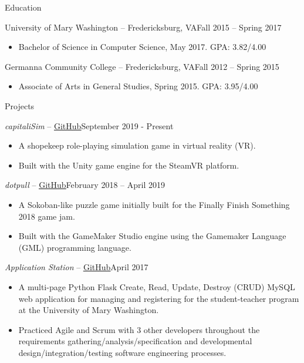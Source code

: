 \documentclass[calibri]{mcdowellcv}
\begin{document}
	\begin{cvsection}{Education}
		\begin{cvsubsection}{University of Mary Washington -- Fredericksburg, VA}{Fall 2015 -- Spring 2017}
			\begin{itemize}
				\item Bachelor of Science in Computer Science, May 2017. GPA: 3.82/4.00
			\end{itemize}
		\end{cvsubsection}
		\begin{cvsubsection}{Germanna Community College -- Fredericksburg, VA}{Fall 2012 -- Spring 2015}
			\begin{itemize}
				\item Associate of Arts in General Studies, Spring 2015. GPA: 3.95/4.00
			\end{itemize}
		\end{cvsubsection}
	\end{cvsection}
	
	\begin{cvsection}{Projects}
		\begin{cvsubsection}{\textit{capitaliSim} -- \href{https://github.com/acarlyle/shopvr}{\underline{GitHub}}}{September 2019 - Present}	
			\begin{itemize}
				\item A shopekeep role-playing simulation game in virtual reality (VR).
				\item Built with the Unity game engine for the SteamVR platform.  
			\end{itemize}
		\end{cvsubsection}
		
		\begin{cvsubsection}{\textit{dotpull} -- \href{https://github.com/acarlyle/dotpull}{\underline{GitHub}}}{February 2018 -- April 2019}	
			\begin{itemize}
				\item A Sokoban-like puzzle game initially built for the Finally Finish Something 2018 game jam.  
				\item Built with the GameMaker Studio engine using the Gamemaker Language (GML) programming language.  
			\end{itemize}
		\end{cvsubsection}
		
		\begin{cvsubsection}{\textit{Application Station} -- \href{https://github.com/acarlyle/InformationStation}{\underline{GitHub}}}{April 2017}		
			\begin{itemize}
				\item A multi-page Python Flask Create, Read, Update, Destroy (CRUD) MySQL web application for managing and registering for the student-teacher program at the University of Mary Washington.   
				\item Practiced Agile and Scrum with 3 other developers throughout the requirements gathering/analysis/specification and developmental design/integration/testing software engineering processes. 
			\end{itemize}
		\end{cvsubsection}
	\end{cvsection}
	
\end{document}
